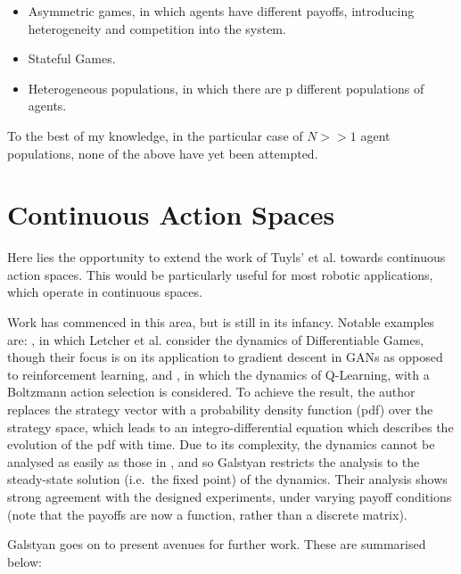 \documentclass[../sample.tex]{subfiles}
\begin{document}
    \begin{itemize}
        \item Asymmetric games, in which agents have different
          payoffs, introducing heterogeneity and competition into the
          system. 
        \item Stateful Games. 
        \item Heterogeneous populations, in which there are p different populations of agents.
    \end{itemize}

    To the best of my knowledge, in the particular case of $N >> 1$ agent populations, none of the
    above have yet been attempted.

    \section{Continuous Action Spaces}

    Here lies the opportunity to extend the work of Tuyls' et
    al. \cite{Tuyls2006AnGames} towards continuous action spaces. This
    would be particularly useful for most robotic applications, which
    operate in continuous spaces. 

    Work has commenced in this area, but is still in its
    infancy. Notable examples are:
    \cite{Letcher2019DifferentiableMechanics}, in which Letcher et
    al. consider the dynamics of Differentiable Games, though their
    focus is on its application to gradient descent in GANs as opposed
    to reinforcement learning, and \cite{Galstyan2013}, in which the
    dynamics of Q-Learning, with a Boltzmann action selection is
    considered. To achieve the result, the author replaces the
    strategy vector with a probability density function (pdf) over the
    strategy space, which leads to an integro-differential equation
    which describes the evolution of the pdf with time. Due to its
    complexity, the dynamics cannot be analysed as easily as those in
    \cite{Tuyls2006AnGames}, and so Galstyan restricts the analysis to
    the steady-state solution (i.e.~the fixed point) of the
    dynamics. Their analysis shows strong agreement with the designed
    experiments, under varying payoff conditions (note that the
    payoffs are now a function, rather than a discrete matrix).

    Galstyan goes on to present avenues for further work. These are summarised below:
\end{document}
